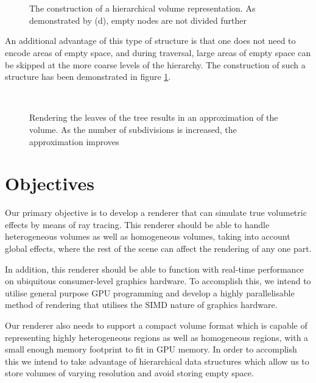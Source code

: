 \begin{figure}
\centering
	\centering
	~
	\\
	~

	\caption{The construction of a hierarchical volume representation. As demonstrated by (d), empty nodes are not divided further}
	\label{fig:space_subdivision}
\end{figure}

An additional advantage of this type of structure is that one does not need to encode areas of empty space, and during traversal, large areas of empty space can be skipped at the more coarse levels of the hierarchy. The construction of such a structure has been demonstrated in figure \ref{fig:space_subdivision}.

\begin{figure}
\centering
	~

	\caption{Rendering the leaves of the tree results in an approximation of the volume. As the number of subdivisions is increased, the approximation improves}
	\label{fig:tree_leaves}
\end{figure}

\section{Objectives}

Our primary objective is to develop a renderer that can simulate true volumetric effects by means of ray tracing. This renderer should be able to handle heterogeneous volumes as well as homogeneous volumes, taking into account global effects, where the rest of the scene can affect the rendering of any one part.

In addition, this renderer should be able to function with real-time performance on ubiquitous consumer-level graphics hardware. To accomplish this, we intend to utilise general purpose GPU programming and develop a highly parallelisable method of rendering that utilises the SIMD nature of graphics hardware.

Our renderer also needs to support a compact volume format which is capable of representing highly heterogeneous regions as well as homogeneous regions, with a small enough memory footprint to fit in GPU memory. In order to accomplish this we intend to take advantage of hierarchical data structures which allow us to store volumes of varying resolution and avoid storing empty space.